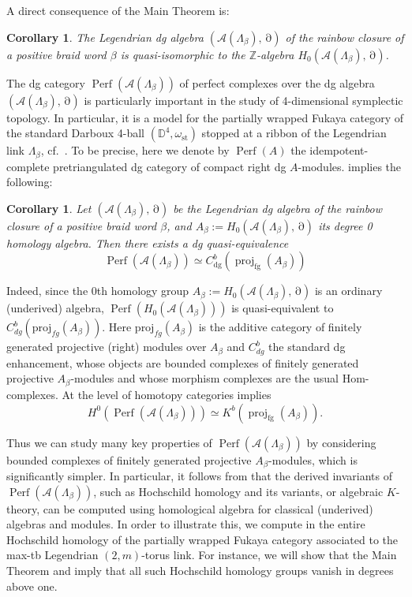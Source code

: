 \documentclass[11pt]{article}
\newtheorem{corollary}[theorem]{Corollary}
\newcommand{\ZZ}{\mathbb Z}
\newcommand{\La}{\Lambda}
\newcommand{\SA}{\mathcal A}
\newcommand{\dd}{\operatorname{\partial}}
\newcommand{\st}{\operatorname{st}}
\newcommand{\fg}{\operatorname{fg}}
\newcommand{\dg}{\operatorname{dg}}
\newcommand{\proj}{\operatorname{proj}}
\newcommand{\perf}{\operatorname{Perf}}
\begin{document}
A direct consequence of the Main Theorem is:

\begin{corollary}\label{cor:main1}
The Legendrian dg algebra $(\SA(\La_\beta),\dd)$ of the rainbow closure of a positive braid word $\beta$ is quasi-isomorphic to the $\ZZ$-algebra $H_0(\SA(\La_\beta),\dd)$.
\end{corollary}

The dg category $\perf(\SA(\La_\beta))$ of perfect complexes over the dg algebra $(\SA(\La_\beta),\dd)$ is particularly important in the study of 4-dimensional symplectic topology. In particular, it is a model for the partially wrapped Fukaya category of the standard Darboux 4-ball $(\mathbb{D}^4,\omega_{\st})$ stopped at a ribbon of the Legendrian link $\La_\beta$, cf.~\cite{Ganatraetal2023,Sylvan2016}. To be precise, here we denote by $\perf(A)$ the idempotent-complete pretriangulated dg category of compact right dg $A$-modules.  implies the following:

\begin{corollary}\label{cor:main2}
Let $(\SA(\La_\beta),\dd)$ be the Legendrian dg algebra of the rainbow closure of a positive braid word $\beta$, and $A_\beta:=H_0(\SA(\La_\beta),\dd)$ its degree 0 homology algebra. Then there exists a dg quasi-equivalence
\begin{equation}\label{eq:derived_equiv_to_H0}
\perf(\SA(\La_\beta))\simeq C_{\dg}^b(\proj_{\fg}(A_\beta))
\end{equation}
\end{corollary}

Indeed, since the $0$th homology group $A_\beta:=H_0(\SA(\La_\beta),\dd)$ is an ordinary (underived) algebra, $\perf(H_0(\SA(\La_\beta)))$ is quasi-equivalent to $C_{dg}^b(\mbox{proj}_{fg}(A_\beta))$. Here $\mbox{proj}_{fg}(A_\beta)$ is the additive category of finitely generated projective (right) modules over $A_\beta$ and $C_{dg}^b$ the standard dg enhancement, whose objects are bounded complexes of finitely generated projective $A_\beta$-modules and whose morphism complexes are the usual Hom-complexes. At the level of homotopy categories  implies
\begin{equation*}\label{eq:derived_equiv_to_H0}
H^0(\perf(\SA(\La_\beta)))\simeq K^b(\proj_{\fg}(A_\beta)).
\end{equation*}

Thus we can study many key properties of $\perf(\SA(\La_\beta))$ by considering bounded complexes of finitely generated projective $A_\beta$-modules, which is significantly simpler. In particular, it follows from  that the derived invariants of $\perf(\SA(\La_\beta))$, such as Hochschild homology and its variants, or algebraic $K$-theory, can be computed using homological algebra for classical (underived) algebras and modules. In order to illustrate this, we compute in  the entire Hochschild homology of the partially wrapped Fukaya category associated to the max-tb Legendrian $(2,m)$-torus link. For instance, we will show that the Main Theorem and  imply that all such Hochschild homology groups vanish in degrees above one.\\
\end{document}
